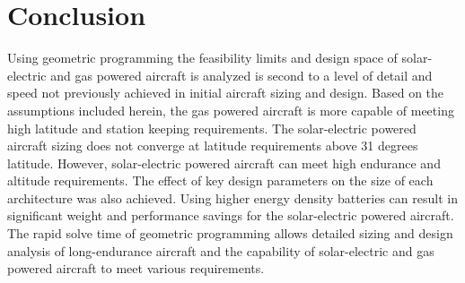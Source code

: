 
\chapter{Conclusion}
Using geometric programming the feasibility limits and design space of solar-electric and gas powered aircraft is analyzed is second to a level of detail and speed not previously achieved in initial aircraft sizing and design. 
Based on the assumptions included herein, the gas powered aircraft is more capable of meeting high latitude and station keeping requirements. 
The solar-electric powered aircraft sizing does not converge at latitude requirements above 31 degrees latitude. 
However, solar-electric powered aircraft can meet high endurance and altitude requirements.  
The effect of key design parameters on the size of each architecture was also achieved.  
Using higher energy density batteries can result in significant weight and performance savings for the solar-electric powered aircraft.  
The rapid solve time of geometric programming allows detailed sizing and design analysis of long-endurance aircraft and the capability of solar-electric and gas powered aircraft to meet various requirements.
